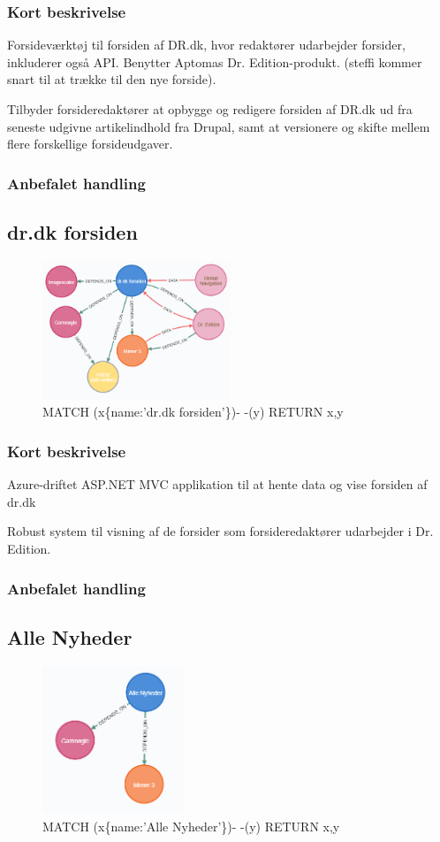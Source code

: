 \documentclass{article}
\begin{document}
\subsubsection{Kort beskrivelse}
Forsideværktøj til forsiden af DR.dk, hvor redaktører udarbejder forsider, inkluderer også API. Benytter Aptomas Dr. Edition-produkt. (steffi kommer snart til at trække til den nye forside). 

Tilbyder forsideredaktører at opbygge og redigere forsiden af DR.dk ud fra seneste udgivne artikelindhold fra Drupal, samt at versionere og skifte mellem flere forskellige forsideudgaver.
\subsubsection{Anbefalet handling}



\subsection{dr.dk forsiden}
\begin{figure}[h]
\includegraphics[width=160pt]{DrDkForsiden.PNG}
\caption{MATCH (x\{name:'dr.dk forsiden'\})- -(y) RETURN x,y}
\end{figure}
\subsubsection{Kort beskrivelse}
Azure-driftet ASP.NET MVC applikation til at hente data og vise forsiden af dr.dk

Robust system til visning af de forsider som forsideredaktører udarbejder i Dr. Edition.
\subsubsection{Anbefalet handling}



\subsection{Alle Nyheder}
\begin{figure}[h]
\includegraphics[width=120pt]{AlleNyheder.PNG}
\caption{MATCH (x\{name:'Alle Nyheder'\})- -(y) RETURN x,y}
\end{figure}
\end{document}
